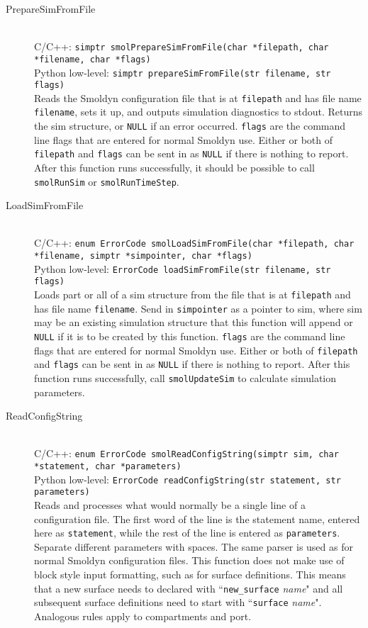 \documentclass {book}
\newcommand {\ttt} {\texttt}
\begin{document}
\begin{description}

\item[PrepareSimFromFile]
\hfill \\
C/C++: \ttt{simptr smolPrepareSimFromFile(char *filepath, char *filename, char *flags)}\\
Python low-level: \ttt{simptr prepareSimFromFile(str filename, str flags)}\\
Reads the Smoldyn configuration file that is at \ttt{filepath} and has file name \ttt{filename}, sets it up, and outputs simulation diagnostics to stdout. Returns the sim structure, or \ttt{NULL} if an error occurred. \ttt{flags} are the command line flags that are entered for normal Smoldyn use. Either or both of \ttt{filepath} and \ttt{flags} can be sent in as \ttt{NULL} if there is nothing to report. After this function runs successfully, it should be possible to call \ttt{smolRunSim} or \ttt{smolRunTimeStep}.

\item[LoadSimFromFile]
\hfill \\
C/C++: \ttt{enum ErrorCode smolLoadSimFromFile(char *filepath, char *filename, simptr *simpointer, char *flags)}\\
Python low-level: \ttt{ErrorCode loadSimFromFile(str filename, str flags)}\\
Loads part or all of a sim structure from the file that is at \ttt{filepath} and has file name \ttt{filename}. Send in \ttt{simpointer} as a pointer to sim, where sim may be an existing simulation structure that this function will append or \ttt{NULL} if it is to be created by this function. \ttt{flags} are the command line flags that are entered for normal Smoldyn use. Either or both of \ttt{filepath} and \ttt{flags} can be sent in as \ttt{NULL} if there is nothing to report. After this function runs successfully, call \ttt{smolUpdateSim} to calculate simulation parameters.

\item[ReadConfigString]
\hfill \\
C/C++: \ttt{enum ErrorCode smolReadConfigString(simptr sim, char *statement, char *parameters)}\\
Python low-level: \ttt{ErrorCode readConfigString(str statement, str parameters)}\\
Reads and processes what would normally be a single line of a configuration file. The first word of the line is the statement name, entered here as \ttt{statement}, while the rest of the line is entered as \ttt{parameters}. Separate different parameters with spaces. The same parser is used as for normal Smoldyn configuration files. This function does not make use of block style input formatting, such as for surface definitions. This means that a new surface needs to declared with ``\ttt{new\_surface} \emph{name}" and all subsequent surface definitions need to start with ``\ttt{surface} \emph{name}". Analogous rules apply to compartments and port.

\end{description}
\end{document}
